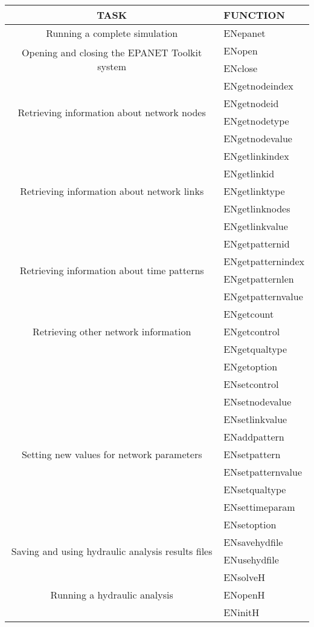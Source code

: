 \begin{longtable}{|c| l|}
\hline
TASK&FUNCTION \\
\hline
\hline
\multirow{1}{*}{Running a complete simulation}
&ENepanet\\
\hline
\multirow{2}{*}{Opening and closing the EPANET Toolkit system}
&ENopen \\
&ENclose \\
\hline
\multirow{4}{*}{Retrieving information about network nodes}
&ENgetnodeindex\\
&ENgetnodeid\\
&ENgetnodetype\\
&ENgetnodevalue\\
\hline
\multirow{5}{*}{Retrieving information about network links}
&ENgetlinkindex\\
&ENgetlinkid\\
&ENgetlinktype\\
&ENgetlinknodes\\
&ENgetlinkvalue\\
\hline
\multirow{4}{*}{Retrieving information about time patterns}
&ENgetpatternid\\
&ENgetpatternindex\\
&ENgetpatternlen\\
&ENgetpatternvalue\\
\hline
\multirow{3}{*}{Retrieving other network information}
&ENgetcount\\
&ENgetcontrol\\
&ENgetqualtype\\
&ENgetoption\\
\hline
\multirow{9}{*}{Setting new values for network parameters}
&ENsetcontrol\\
&ENsetnodevalue\\
&ENsetlinkvalue\\
&ENaddpattern\\
&ENsetpattern\\
&ENsetpatternvalue\\
&ENsetqualtype\\
&ENsettimeparam\\
&ENsetoption\\
\hline
\multirow{2}{*}{Saving and using hydraulic analysis results files}
&ENsavehydfile\\
&ENusehydfile\\
\hline
\multirow{6}{*}{Running a hydraulic analysis}
&ENsolveH\\
&ENopenH\\
&ENinitH\\

\end{longtable}
